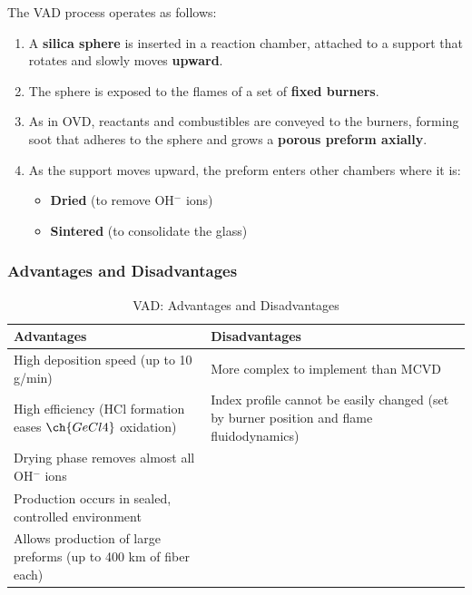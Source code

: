 \documentclass[a4paper, 11pt]{article}
\begin{document}
The VAD process operates as follows:

\begin{enumerate}[leftmargin=*]
    \item A \textbf{silica sphere} is inserted in a reaction chamber, attached to a support that rotates and slowly moves \textbf{upward}.
    
    \item The sphere is exposed to the flames of a set of \textbf{fixed burners}.
    
    \item As in OVD, reactants and combustibles are conveyed to the burners, forming soot that adheres to the sphere and grows a \textbf{porous preform axially}.
    
    \item As the support moves upward, the preform enters other chambers where it is:
    \begin{itemize}
        \item \textbf{Dried} (to remove OH$^-$ ions)
        \item \textbf{Sintered} (to consolidate the glass)
    \end{itemize}
\end{enumerate}

\subsubsection{Advantages and Disadvantages}

\begin{table}[H]
    \centering
    \caption{VAD: Advantages and Disadvantages}
    \label{tab:vad_pros_cons}
    \begin{tabularx}{\textwidth}{X|X}
        \toprule
        \textbf{Advantages} & \textbf{Disadvantages} \\
        \midrule
        High deposition speed (up to 10 g/min) & More complex to implement than MCVD \\
        \addlinespace
        High efficiency (HCl formation eases $\ch{GeCl4}$ oxidation) & Index profile cannot be easily changed (set by burner position and flame fluidodynamics) \\
        \addlinespace
        Drying phase removes almost all OH$^-$ ions & \\
        \addlinespace
        Production occurs in sealed, controlled environment & \\
        \addlinespace
        Allows production of large preforms (up to 400 km of fiber each) & \\
        \bottomrule
    \end{tabularx}
\end{table}
\end{document}
